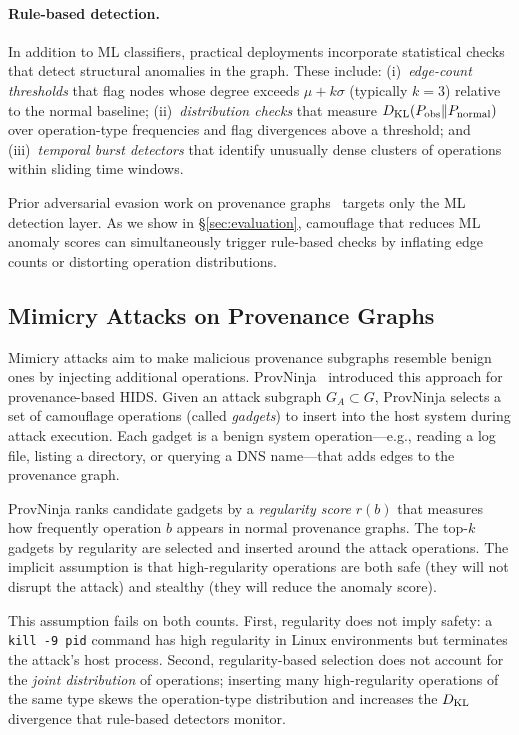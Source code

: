 \paragraph{Rule-based detection.}
In addition to ML classifiers, practical deployments incorporate statistical checks that detect structural anomalies in the graph.
These include: (i)~\emph{edge-count thresholds} that flag nodes whose degree exceeds $\mu + k\sigma$ (typically $k=3$) relative to the normal baseline; (ii)~\emph{distribution checks} that measure $D_{\text{KL}}(P_{\text{obs}} \| P_{\text{normal}})$ over operation-type frequencies and flag divergences above a threshold; and (iii)~\emph{temporal burst detectors} that identify unusually dense clusters of operations within sliding time windows.

Prior adversarial evasion work on provenance graphs~\cite{provninja} targets only the ML detection layer.
As we show in \S\ref{sec:evaluation}, camouflage that reduces ML anomaly scores can simultaneously trigger rule-based checks by inflating edge counts or distorting operation distributions.

\subsection{Mimicry Attacks on Provenance Graphs}
\label{sec:bg-mimicry}

Mimicry attacks aim to make malicious provenance subgraphs resemble benign ones by injecting additional operations.
ProvNinja~\cite{provninja} introduced this approach for provenance-based HIDS.
Given an attack subgraph $G_A \subset G$, ProvNinja selects a set of camouflage operations (called \emph{gadgets}) to insert into the host system during attack execution.
Each gadget is a benign system operation---e.g., reading a log file, listing a directory, or querying a DNS name---that adds edges to the provenance graph.

ProvNinja ranks candidate gadgets by a \emph{regularity score} $r(b)$ that measures how frequently operation $b$ appears in normal provenance graphs.
The top-$k$ gadgets by regularity are selected and inserted around the attack operations.
The implicit assumption is that high-regularity operations are both safe (they will not disrupt the attack) and stealthy (they will reduce the anomaly score).

This assumption fails on both counts.
First, regularity does not imply safety: a \texttt{kill -9 \textlangle pid\textrangle} command has high regularity in Linux environments but terminates the attack's host process.
Second, regularity-based selection does not account for the \emph{joint distribution} of operations; inserting many high-regularity operations of the same type skews the operation-type distribution and increases the $D_{\text{KL}}$ divergence that rule-based detectors monitor.

